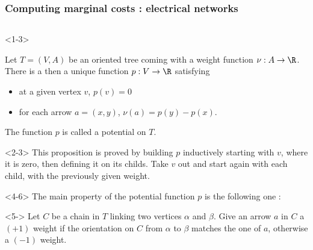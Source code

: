 \documentclass[32pt,aspectratio=169]{beamer}
\begin{document}
\begin{frame}
  \frametitle{Computing marginal costs : electrical networks}
    \begin{columns}
    \begin{column}{.6\textwidth}
      \begin{overlayarea}{\textwidth}{.78\textheight}
        \begin{onlyenv}<1-3>
          \begin{prop}
            Let $T = (V, A)$ be an oriented tree coming with a weight
            function $\nu : A \to \R$. There is a then a unique function
            $p : V \to \R$ satisfying
            \begin{itemize}
            \item at a given vertex $v$, $p(v) = 0$ 
            \item for each arrow $a = (x, y)$, $\nu(a) = p(y) - p(x)$.
            \end{itemize}
            The function $p$ is called a potential on $T$. 
          \end{prop}
          \begin{uncoverenv}<2-3>
            This proposition is proved by building $p$ inductively starting
            with $v$, where it is zero, then defining it on its childs. Take
            $v$ out and start again with each child, with the previously
            given weight.
          \end{uncoverenv}
        \end{onlyenv}
        \begin{onlyenv}<4-6>
          The main property of the potential function $p$ is the
          following one : 

          \begin{uncoverenv}<5->
            \vspace{.5\baselineskip}
            Let $C$ be a chain in $T$ linking two vertices $\alpha$ and
            $\beta$.  Give an arrow $a$ in $C$ a $(+1)$ weight if the
            orientation on $C$ from $\alpha$ to $\beta$ matches the one
            of $a$, otherwise a $(-1)$ weight.
          \end{uncoverenv}
          

\end{onlyenv}
\end{overlayarea}
\end{column}
\end{columns}
\end{frame}
\end{document}
